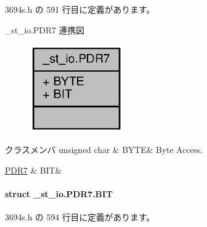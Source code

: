  3694s.\+h の 591 行目に定義があります。



\+\_\+st\+\_\+io.\+P\+D\+R7 連携図
\nopagebreak
\begin{figure}[H]
\begin{center}
\leavevmode
\includegraphics[width=117pt]{d2/d63/union__st__io_8PDR7__coll__graph}
\end{center}
\end{figure}
\begin{DoxyFields}{クラスメンバ}
unsigned char\label{3694s_8h_ae409eb2ba6eb6801f52763ae370c350e}
&
B\+Y\+T\+E&
Byte Access. \\
\hline

\hyperlink{3694s_8h_d7/dae/struct__st__io_8PDR7_8BIT}{P\+D\+R7}\label{3694s_8h_adb957fdc8000e1eef04a243f5199aa52}
&
B\+I\+T&
\\
\hline

\end{DoxyFields}
\label{struct__st__io_8PDR7_8BIT}
\paragraph{struct \+\_\+st\+\_\+io.\+P\+D\+R7.\+B\+I\+T}


 3694s.\+h の 594 行目に定義があります。



